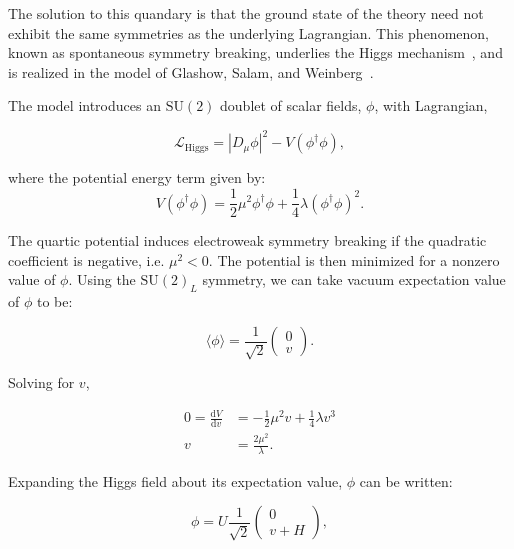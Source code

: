 The solution to this quandary is that the ground state of the theory need not exhibit the same symmetries as the underlying Lagrangian. This phenomenon, known as spontaneous symmetry breaking, underlies the Higgs mechanism~\cite{Higgs:1964pj,Englert:1964et,Guralnik:1964eu}, and is realized in the model of Glashow, Salam, and Weinberg~\cite{Glashow:1961tr,Weinberg:1967tq,Salam:1968rm}. 

The model introduces an $\mathrm{SU}(2)$ doublet of scalar fields, $\phi$, with Lagrangian,


\begin{equation}\label{eqn:higg-lagrangian}
	\mathcal{L}_{\mathrm{Higgs}} = |D_{\mu}\phi|^2 - V(\phi^{\dagger}\phi),
\end{equation}

where the potential energy term given by:
\begin{equation}\label{eqn:higgs-potential}
	V(\phi^{\dagger}\phi) = \frac12 \mu^2 \phi^{\dagger}\phi + \frac14 \lambda (\phi^{\dagger}\phi)^2.
\end{equation}


The quartic potential induces electroweak symmetry breaking if the quadratic coefficient is negative, i.e. $\mu^2<0$. The potential is then minimized for a nonzero value of $\phi$. Using the $\mathrm{SU}(2)_L$ symmetry, we can take vacuum expectation value of $\phi$ to be:

\begin{equation}
	\langle \phi \rangle = \frac{1}{\sqrt{2}} \left(\begin{array}{c} 0 \\ v \end{array}\right).
\end{equation}
 
Solving for $v$,

\begin{align}
	0 = \frac{\mathrm{d}V}{\mathrm{d}v} &= -\frac12\mu^2 v + \frac14\lambda v^3 \\
	v &= \frac{2\mu^2}{\lambda}.
\end{align}

Expanding the Higgs field about its expectation value, $\phi$ can be written:

\begin{equation}
	\phi = U \frac{1}{\sqrt{2}} \left(\begin{array}{c} 0 \\ v+H \end{array}\right),
\end{equation}


